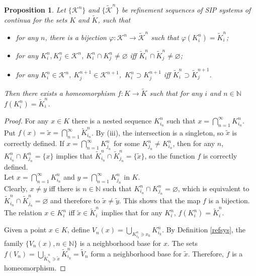 \documentclass[11pt,reqno]{amsart}
\newtheorem{proposition}[theorem]{Proposition}
\begin{document}
\begin{proposition}\label{sip_qom}
Let  $\{\mathcal  K^n\}$  and $\{\tilde{\mathcal {K}}^n\}$ be   refinement sequences of SIP systems of continua for the sets $K$ and $\tilde{K}$, such that 
\begin{itemize}
\item[(i)] for any $n$, there is a bijection  $ \varphi:\mathcal{K}^n\to  \mathcal{\tilde K}^n$   such that $\varphi( K_i^n) =\tilde K_i^n $;
\item[(ii)] for any $K_i^n, K_j^n\in{\mathcal K^n}$, $K_i^n\cap K_j^n\neq\varnothing $ iff $ \tilde  K_i^n\cap \tilde K_j^n\neq\varnothing$;
\item[(iii)] for any $K_i^n\in\mathcal K^n,\ K_j^{n+1}\in\mathcal K^{n+1}$,\  $K_i^n\supset K_j^{n+1}$ iff $ \tilde  K_i^n\supset \tilde K_j^{n+1}$.
\end{itemize}
Then there exists a homeomorphism $f : K \to \tilde{K}$ such that for any $i$ and $n \in \mathbb{N} $ $f(K_{i}^n) = \tilde{K}_{i}^n$. 
\end{proposition}

\begin{proof}

For any $x\in K$ there is a  nested sequence  $K_{ i_n}^n$  such that $x = \bigcap\limits_{n=1}^\infty K_{ i_n}^n$. Put $f(x)=\tilde x= \bigcap\limits_{n=1}^\infty \tilde K_{ i_n}^n$. By   (iii), the intersection is a singleton, so $\tilde x$ is correctly defined. If $x=\bigcap\limits_{n=1}^\infty K_{ j_n}^n$ for some $ K_{ j_n}^n \neq K_{ i_n}^n$, then for any $n$, $K_{ i_n}^n\cap K_{ j_n}^n=\{x\}$   implies that $\tilde K_{ i_n}^n\cap \tilde K_{ j_n}^n=\{\tilde x\}$, so
the function $f$ is correctly defined. \\
Let $x = \bigcap\limits_{n=1}^\infty K_{ i_n}^n$ and
$  y = \bigcap\limits_{n=1}^\infty K_{ j_n}^n$ in $K$.\\
Clearly, $x \neq y $ iff there is $n \in \mathbb{N}$ such that 
$K_{ i_n}^n \cap K_{ j_n}^n = \varnothing$, which is equivalent to $\tilde{K}_{i_n}^n \cap \tilde{K}_{j_n}^n = \varnothing $ and  therefore  to $\tilde{x} \neq \tilde{y}$. This shows that the map $f$ is a bijection. \\

The relation $x\in K_i^n$ iff $\tilde x\in\tilde K_i^n$ implies that for any $K_i^n$, $f(K_i^n)=\tilde K_i^n$.

Given a point $x\in K$, define 
$V_n(x)= \bigcup\limits_{K_{i_k}^n \ni x_0} K_{i_k}^n $. By Definition \ref{refsys}, the family $\{V_n(x), n\in \mathbb{N}\}$ is a neighborhood base for $x$. The sets  
$f(V_n)=\bigcup\limits_{\tilde K_{i_k}^n \ni \tilde x} \tilde K_{i_k}^n=\tilde V_n$ form a
 neighborhood base for $\tilde x$. Therefore, $f$ is a homeomorphism. 
\end{proof}
\end{document}
